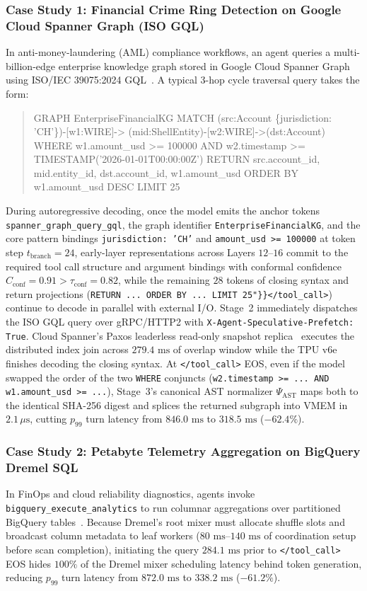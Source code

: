 \documentclass[10pt,conference]{IEEEtran}
\begin{document}
\subsubsection{Case Study 1: Financial Crime Ring Detection on Google Cloud Spanner Graph (ISO GQL)}
In anti-money-laundering (AML) compliance workflows, an agent queries a multi-billion-edge enterprise knowledge graph stored in Google Cloud Spanner Graph~\cite{corbett2012spanner} using ISO/IEC 39075:2024 GQL~\cite{iso2024gql}. A typical 3-hop cycle traversal query takes the form:
\begin{quote}
\scriptsize\ttfamily
GRAPH EnterpriseFinancialKG MATCH (src:Account \{jurisdiction: 'CH'\})-[w1:WIRE]-> (mid:ShellEntity)-[w2:WIRE]->(dst:Account) WHERE w1.amount\_usd >= 100000 AND w2.timestamp >= TIMESTAMP('2026-01-01T00:00:00Z') RETURN src.account\_id, mid.entity\_id, dst.account\_id, w1.amount\_usd ORDER BY w1.amount\_usd DESC LIMIT 25
\end{quote}
During autoregressive decoding, once the model emits the anchor tokens \texttt{spanner\_graph\_query\_gql}, the graph identifier \texttt{EnterpriseFinancialKG}, and the core pattern bindings \texttt{jurisdiction: 'CH'} and \texttt{amount\_usd >= 100000} at token step $t_{\text{branch}} = 24$, early-layer representations across Layers $12$--$16$ commit to the required tool call structure and argument bindings with conformal confidence $C_{\text{conf}} = 0.91 > \tau_{\text{conf}} = 0.82$, while the remaining $28$ tokens of closing syntax and return projections (\texttt{RETURN ... ORDER BY ... LIMIT 25"\}\}</tool\_call>}) continue to decode in parallel with external I/O. Stage~2 immediately dispatches the ISO GQL query over gRPC/HTTP2 with \texttt{X-Agent-Speculative-Prefetch: True}. Cloud Spanner's Paxos leaderless read-only snapshot replica~\cite{corbett2012spanner} executes the distributed index join across $279.4\text{ ms}$ of overlap window while the TPU v6e finishes decoding the closing syntax. At \texttt{</tool\_call>} EOS, even if the model swapped the order of the two \texttt{WHERE} conjuncts (\texttt{w2.timestamp >= ... AND w1.amount\_usd >= ...}), Stage~3's canonical AST normalizer $\Psi_{\text{AST}}$ maps both to the identical SHA-256 digest and splices the returned subgraph into VMEM in $2.1\,\mu\text{s}$, cutting $p_{99}$ turn latency from $846.0\text{ ms}$ to $318.5\text{ ms}$ ($-62.4\%$).

\subsubsection{Case Study 2: Petabyte Telemetry Aggregation on BigQuery Dremel SQL}
In FinOps and cloud reliability diagnostics, agents invoke \texttt{bigquery\_execute\_analytics} to run columnar aggregations over partitioned BigQuery tables~\cite{melnik2010dremel}. Because Dremel's root mixer must allocate shuffle slots and broadcast column metadata to leaf workers ($80\text{ ms}$--$140\text{ ms}$ of coordination setup before scan completion), initiating the query $284.1\text{ ms}$ prior to \texttt{</tool\_call>} EOS hides $100\%$ of the Dremel mixer scheduling latency behind token generation, reducing $p_{99}$ turn latency from $872.0\text{ ms}$ to $338.2\text{ ms}$ ($-61.2\%$).
\end{document}
